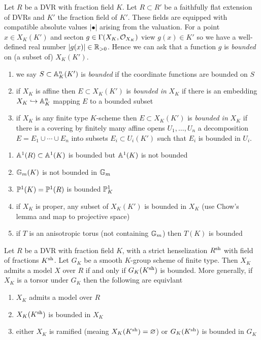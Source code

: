 \documentclass[12pt]{article}
\begin{document}
\begin{defn}
Let $R$ be a DVR with fraction field $K$. Let $R \subset R'$ be a faithfully flat extension of DVRs and $K'$ the fraction field of $K'$. These fields are equipped with compatible absolute values $| \bullet |$ arising from the valuation. For a point $x \in X_K(K')$ and secton $g \in \Gamma(X_K, \struct{X_K})$ view $g(x) \in K'$ so we have a well-defined real number $|g(x)| \in \RR_{>0}$. Hence we can ask that a function $g$ is \textit{bounded} on (a subset of) $X_K(K')$. 
\begin{enumerate}
\item we say $S \subset \A^n_K(K')$ is \textit{bounded} if the coordinate functions are bounded on $S$
\item if $X_K$ is affine then $E \subset X_K(K')$ is \textit{bounded in} $X_K$ if there is an embedding $X_K \embed \A^n_K$ mapping $E$ to a bounded subset
\item if $X_K$ is any finite type $K$-scheme then $E \subset X_K(K')$ is \textit{bounded in} $X_K$ if there is a covering by finitely many affine opens $U_1, \dots, U_n$ a decomposition $E = E_1 \cup \cdots \cup E_n$ into subsets $E_i \subset U_i(K')$ such that $E_i$ is bounded in $U_i$.
\end{enumerate}
\end{defn}

\begin{example}
\begin{enumerate}
\item $\A^1(R) \subset \A^1(K)$ is bounded but $\A^1(K)$ is not bounded
\item $\Gm(K)$ is not bounded in $\Gm$
\item $\P^1(K) = \P^1(R)$ is bounded $\P^1_K$
\item if $X_K$ is proper, any subset of $X_K(K')$ is bounded in $X_K$ (use Chow's lemma and map to projective space)
\item if $T$ is an anisotropic torus (not containing $\Gm$) then $T(K)$ is bounded 
\end{enumerate}
\end{example}

\begin{theorem}
Let $R$ be a DVR with fraction field $K$, with a strict henselization $R^{\sh}$ with field of fractions $K^{\sh}$. Let $G_K$ be a smooth $K$-group scheme of finite type. Then $X_K$ admits a \Neron model $X$ over $R$ if and only if $G_K(K^{\sh})$ is bounded. More generally, if $X_K$ is a torsor under $G_K$ then the following are equivlant
\begin{enumerate}
\item $X_K$ admits a \Neron model over $R$
\item $X_K(K^{\sh})$ is bounded in $X_K$
\item either $X_K$ is ramified (meaing $X_K(K^{\sh}) = \empty$) or $G_K(K^{\sh})$ is bounded in $G_K$
\end{enumerate}
\end{theorem}
\end{document}
